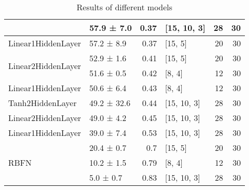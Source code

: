 \begin{table*}
\begin{tabular}{llrlrr}
                                            & 57.9 ± 7.0  &  0.37 & [15, 10, 3]    &         28 &       30 \\
 \hline
Linear1HiddenLayer                  & 57.2 ± 8.9  &  0.37 & [15, 5]        &         20 &       30 \\
 \hline
\multirow{2}{*}{Linear2HiddenLayer} & 52.9 ± 1.6  &  0.41 & [15, 5]        &         20 &       30 \\
                                            & 51.6 ± 0.5  &  0.42 & [8, 4]         &         12 &       30 \\
 \hline
Linear1HiddenLayer                  & 50.6 ± 6.4  &  0.43 & [8, 4]         &         12 &       30 \\
 \hline
Tanh2HiddenLayer                    & 49.2 ± 32.6 &  0.44 & [15, 10, 3]    &         28 &       30 \\
 \hline
Linear2HiddenLayer                  & 49.0 ± 4.2  &  0.45 & [15, 10, 3]    &         28 &       30 \\
 \hline
Linear1HiddenLayer                  & 39.0 ± 7.4  &  0.53 & [15, 10, 3]    &         28 &       30 \\
 \hline
\multirow{3}{*}{RBFN}               & 20.4 ± 0.7  &  0.7  & [15, 5]        &         20 &       30 \\
                                            & 10.2 ± 1.5  &  0.79 & [8, 4]         &         12 &       30 \\
                                            & 5.0 ± 0.7   &  0.83 & [15, 10, 3]    &         28 &       30 \\
\hline
\end{tabular}
        \caption{Results of different models}
        \label{models}
    \end{table*}
    
